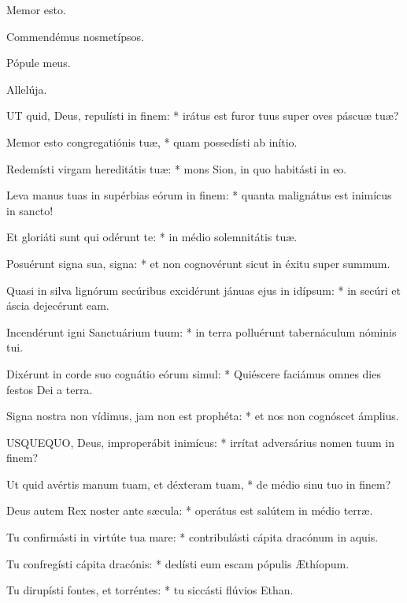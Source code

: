   Memor esto.



 Commendémus nosmetípsos.


 Pópule meus.

  Allelúja.


\lettrine[lines=2]{U}{T} quid, Deus, repulísti in finem: * irátus est furor tuus super oves páscuæ tuæ?

Memor esto congregatiónis tuæ, * quam possedísti ab inítio.

Redemísti virgam hereditátis tuæ: * mons Sion, in quo habitásti in eo.

Leva manus tuas in supérbias eórum in finem: * quanta malignátus est inimícus in sancto!

Et gloriáti sunt qui odérunt te: * in médio solemnitátis tuæ.

Posuérunt signa sua, signa: * et non cognovérunt sicut in éxitu super summum.

Quasi in silva lignórum secúribus excidérunt jánuas ejus in idípsum: * in secúri et áscia dejecérunt eam.

Incendérunt igni Sanctuárium tuum: * in terra polluérunt tabernáculum nóminis tui.

Dixérunt in corde suo cognátio eórum simul: * Quiéscere faciámus omnes dies festos Dei a terra.

Signa nostra non vídimus, jam non est prophéta: * et nos non cognóscet ámplius.


\lettrine[lines=2]{U}{SQUEQUO}, Deus, improperábit inimícus: * irrítat adversárius nomen tuum in finem?

Ut quid avértis manum tuam, et déxteram tuam, * de médio sinu tuo in finem?

Deus autem Rex noster ante sæcula: * operátus est salútem in médio terræ.

Tu confirmásti in virtúte tua mare: * contribulásti cápita dracónum in aquis.

Tu confregísti cápita dracónis: * dedísti eum escam pópulis Æthíopum.

Tu dirupísti fontes, et torréntes: * tu siccásti flúvios Ethan.


